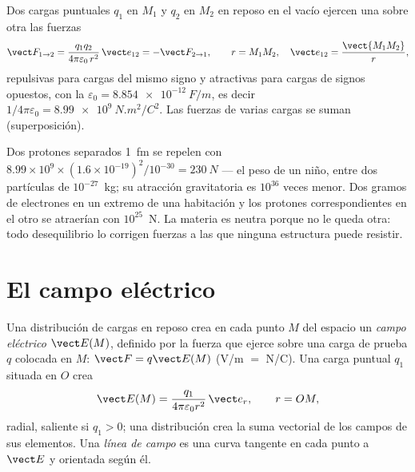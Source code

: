 \begin{theorem}\label{thm:b1:electrostatics-gauss:coulomb}
Dos cargas puntuales $q_1$ en $M_1$ y $q_2$ en $M_2$ en reposo en el vacío
ejercen una sobre otra las fuerzas
\[
\vect F_{1 \to 2} = \frac{q_1q_2}{4\pi\varepsilon_0\,r^2}\,\vect e_{12} = -\vect F_{2 \to 1},
\qquad r = M_1M_2,\quad \vect e_{12} = \frac{\vect{M_1M_2}}{r},
\]
repulsivas para cargas del mismo signo y atractivas para cargas de signos
opuestos, con la \emph{} $\varepsilon_0 = \qty{8.854e-12}{F/m}$, es decir
$1/4\pi\varepsilon_0 = \qty{8.99e9}{N.m^2/C^2}$. Las fuerzas de varias cargas se suman
(superposición).
\end{theorem}
\admitted

\begin{example}\label{ex:b1:electrostatics-gauss:strong}
Dos protones separados \qty{1}{fm} se repelen con $8.99 \times 10^9 \times (1.6 \times
10^{-19})^2/10^{-30} = \qty{230}{N}$ --- el peso de un niño, entre dos
partículas de $10^{-27}$~kg; su atracción gravitatoria es
$10^{36}$ veces menor. Dos gramos de electrones en un extremo de una
habitación y los protones correspondientes en el otro se atraerían con $10^{25}$~N.
La materia es neutra porque no le queda otra: todo desequilibrio lo
corrigen fuerzas a las que ninguna estructura puede resistir.
\end{example}

\section{El campo eléctrico}

\begin{definition}\label{def:b1:electrostatics-gauss:field}
Una distribución de cargas en reposo crea en cada punto $M$ del espacio
un \emph{campo eléctrico} $\vect E(M)$, definido por la fuerza que ejerce
sobre una carga de prueba $q$ colocada en $M$: $\vect F = q\vect E(M)$ (\unit{V/m} $=$
\unit{N/C}). Una carga puntual $q_1$ situada en $O$ crea
\[
\vect E(M) = \frac{q_1}{4\pi\varepsilon_0 r^2}\,\vect e_r , \qquad r = OM ,
\]
radial, saliente si $q_1 > 0$; una distribución crea la suma vectorial de
los campos de sus elementos. Una \emph{línea de campo} es una curva
tangente en cada punto a $\vect E$ y orientada según él.
\end{definition}

